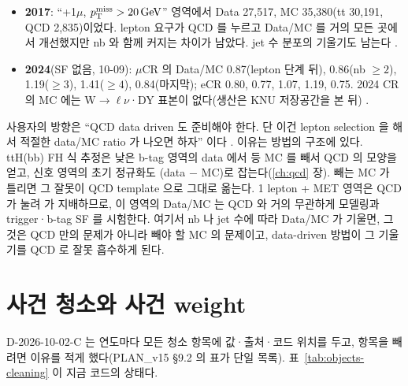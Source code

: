 \begin{itemize}
\item \textbf{2017}: ``+1$\mu$, $p_{\mathrm{T}}^{\mathrm{miss}}>20\,\mathrm{GeV}$'' 영역에서 Data 27,517, MC 35,380(tt 30,191, QCD 2,835)이었다. lepton 요구가 QCD 를 누르고
  Data/MC 를 거의 모든 곳에서 개선했지만 nb 와 함께 커지는 차이가 남았다. jet 수 분포의 기울기도 남는다
  .
\item \textbf{2024}(SF 없음, 10-09): $\mu$CR 의 Data/MC 0.87(lepton 단계 뒤), 0.86(nb $\geq 2$), 1.19($\geq 3$), 1.41($\geq 4$), 0.84(마지막);
  eCR 0.80, 0.77, 1.07, 1.19, 0.75. 2024 CR 의 MC 에는 W$\to\ell\nu$·DY 표본이 없다(생산은 KNU 저장공간을 본 뒤)
  \tagopen.
\end{itemize}

\begin{note}
사용자의 방향은 ``QCD data driven 도 준비해야 한다. 단 이건 lepton selection 을 해서 적절한 data/MC ratio 가 나오면 하자'' 이다
. 이유는 방법의 구조에 있다. ttH(bb) FH 식 추정은 낮은 b-tag 영역의 data 에서 \ttbar{} 등 MC 를 빼서 QCD 의
모양을 얻고, 신호 영역의 초기 정규화도 (data $-$ MC)로 잡는다(\ref{ch:qcd} 장). 빼는 MC 가 틀리면 그 잘못이 QCD
template 으로 그대로 옮는다. 1 lepton + MET 영역은 QCD 가 눌려 \ttbar{} 가 지배하므로, 이 영역의 Data/MC 는 QCD 와 거의 무관하게
\ttbar{} 모델링과 trigger·b-tag SF 를 시험한다. 여기서 nb 나 jet 수에 따라 Data/MC 가 기울면, 그것은 QCD 만의 문제가 아니라 빼야 할 MC 의
문제이고, data-driven 방법이 그 기울기를 QCD 로 잘못 흡수하게 된다\tagours.
\end{note}

\section{사건 청소와 사건 weight}\label{sec:objects-cleaning}

D-2026-10-02-C 는 연도마다 모든 청소 항목에 값·출처·코드 위치를 두고, 항목을 빼려면 이유를 적게 했다(PLAN\_v15 §9.2 의 표가 단일
목록). 표~\ref{tab:objects-cleaning} 이 지금 코드의 상태다.

